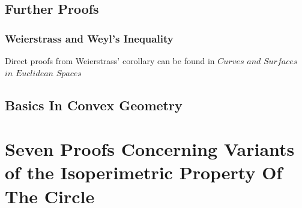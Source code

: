 \documentclass[a4paper]{book}
\begin{document}
\subsection{Further Proofs}
\subsubsection{Weierstrass and Weyl's Inequality}
Direct proofs from Weierstrass' corollary can be found in $Curves$ $and$ $Surfaces$ $in$ $Euclidean$ $Spaces$~\cite{chern1966curves}

\subsection{Basics In Convex Geometry}

\section{Seven Proofs Concerning Variants of the Isoperimetric Property Of The Circle}
\end{document}
